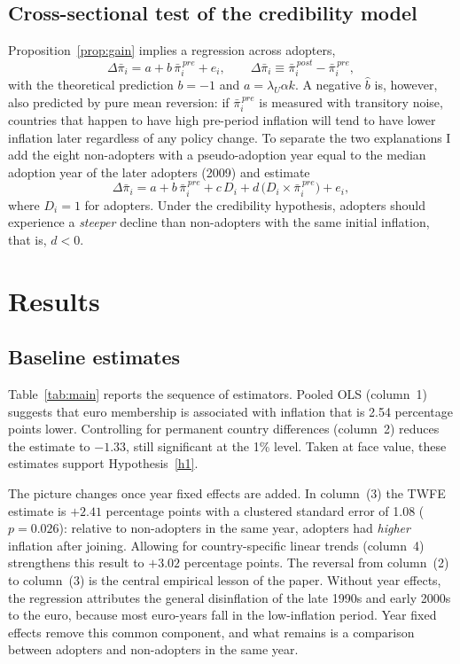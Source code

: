 \documentclass[11pt,a4paper]{article}
\numberwithin{equation}{section}
\theoremstyle{definition}
\theoremstyle{remark}
\begin{document}
\subsection{Cross-sectional test of the credibility model}
Proposition~\ref{prop:gain} implies a regression across adopters,
\begin{equation}
\Delta\bar{\pi}_i = a + b\,\bar{\pi}_i^{\,pre} + e_i,
\qquad \Delta\bar{\pi}_i \equiv \bar{\pi}_i^{\,post} - \bar{\pi}_i^{\,pre},
\label{eq:cross}
\end{equation}
with the theoretical prediction $b=-1$ and $a=\lambda_U\alpha k$. A negative $\hat b$ is, however, also predicted by pure mean reversion: if $\bar{\pi}_i^{\,pre}$ is measured with transitory noise, countries that happen to have high pre-period inflation will tend to have lower inflation later regardless of any policy change. To separate the two explanations I add the eight non-adopters with a pseudo-adoption year equal to the median adoption year of the later adopters (2009) and estimate
\begin{equation}
\Delta\bar{\pi}_i = a + b\,\bar{\pi}_i^{\,pre} + c\,D_i + d\,\big(D_i \times \bar{\pi}_i^{\,pre}\big) + e_i,
\label{eq:placebo}
\end{equation}
where $D_i=1$ for adopters. Under the credibility hypothesis, adopters should experience a \emph{steeper} decline than non-adopters with the same initial inflation, that is, $d<0$.

\section{Results}\label{sec:results}

\subsection{Baseline estimates}
Table~\ref{tab:main} reports the sequence of estimators. Pooled OLS (column~1) suggests that euro membership is associated with inflation that is 2.54 percentage points lower. Controlling for permanent country differences (column~2) reduces the estimate to $-1.33$, still significant at the 1\% level. Taken at face value, these estimates support Hypothesis~\ref{h1}.



The picture changes once year fixed effects are added. In column~(3) the TWFE estimate is $+2.41$ percentage points with a clustered standard error of 1.08 ($p=0.026$): relative to non-adopters in the same year, adopters had \emph{higher} inflation after joining. Allowing for country-specific linear trends (column~4) strengthens this result to $+3.02$ percentage points. The reversal from column~(2) to column~(3) is the central empirical lesson of the paper. Without year effects, the regression attributes the general disinflation of the late 1990s and early 2000s to the euro, because most euro-years fall in the low-inflation period. Year fixed effects remove this common component, and what remains is a comparison between adopters and non-adopters in the same year.
\end{document}
